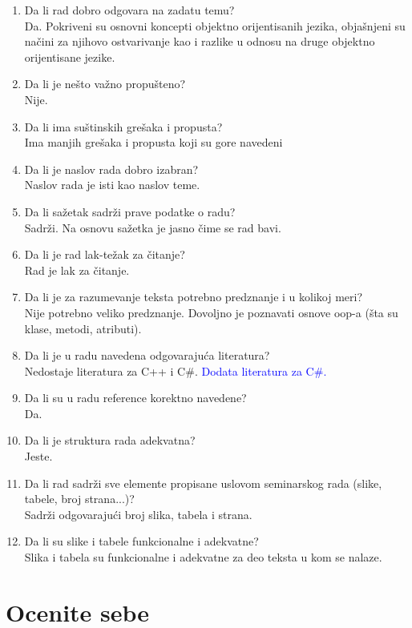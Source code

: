 \documentclass[a4paper]{report}
\newcommand{\odgovor}[1]{\textcolor{blue}{#1}}
\begin{document}
\begin{enumerate}
\item Da li rad dobro odgovara na zadatu temu?\\
Da. Pokriveni su osnovni koncepti objektno orijentisanih jezika, obja\v snjeni su na\v cini za njihovo ostvarivanje kao i razlike u odnosu na druge objektno orijentisane jezike.
\item Da li je nešto važno propušteno?\\
Nije.
\item Da li ima suštinskih grešaka i propusta?\\
Ima manjih gre\v saka i propusta koji su gore navedeni
\item Da li je naslov rada dobro izabran?\\
Naslov rada je isti kao naslov teme.
\item Da li sažetak sadrži prave podatke o radu?\\
Sadr\v zi. Na osnovu sa\v zetka je jasno \v cime se rad bavi.
\item Da li je rad lak-težak za čitanje?\\
Rad je lak za \v citanje.
\item Da li je za razumevanje teksta potrebno predznanje i u kolikoj meri?\\
Nije potrebno veliko predznanje. Dovoljno je poznavati osnove oop-a (\v sta su klase, metodi, atributi).
\item Da li je u radu navedena odgovarajuća literatura?\\
Nedostaje literatura za C++ i C\#.
\odgovor{
Dodata literatura za C\#.
}

\item Da li su u radu reference korektno navedene?\\
Da.
\item Da li je struktura rada adekvatna?\\
Jeste.
\item Da li rad sadrži sve elemente propisane uslovom seminarskog rada (slike, tabele, broj strana...)?\\
Sadr\v zi odgovaraju\'ci broj slika, tabela i strana.
\item Da li su slike i tabele funkcionalne i adekvatne?\\
Slika i tabela su funkcionalne i adekvatne za deo teksta u kom se nalaze.
\end{enumerate}

\section{Ocenite sebe}
\end{document}

